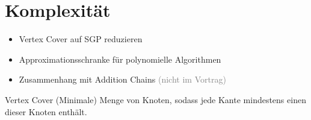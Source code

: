 \section{Komplexität}
	
\begin{frame}{\FrameName}
\begin{itemize}[<+->]
	\item Vertex Cover auf SGP reduzieren
	\item Approximationsschranke für polynomielle Algorithmen
	\item Zusammenhang mit Addition Chains \textcolor{gray}{(nicht im Vortrag)}
\end{itemize}
\end{frame}

\begin{frame}{\FrameName}
\begin{block}{Vertex Cover}
	\Gap
	(Minimale) Menge von Knoten, sodass jede Kante mindestens einen dieser Knoten enthält.\linebreak
	$ $\linebreak
	
\end{block}
\end{frame}

